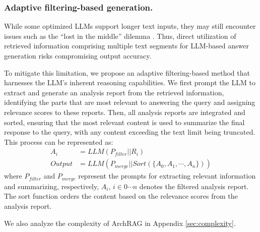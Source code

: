 % 



\subsubsection{Adaptive filtering-based generation. }
While some optimized LLMs support longer text inputs, they may still encounter issues such as the ``lost in the middle'' dilemma \cite{liu2024lost}. 
% 
Thus, direct utilization of retrieved information comprising multiple text segments for LLM-based answer generation risks compromising output accuracy.

To mitigate this limitation, we propose an adaptive filtering-based method that harnesses the LLM’s inherent reasoning capabilities.
% 
We first prompt the LLM to extract and generate an analysis report from the retrieved information, identifying the parts that are most relevant to answering the query and assigning relevance scores to these reports.
% 
Then, all analysis reports are integrated and sorted, ensuring that the most relevant content is used to summarize the final response to the query, with any content exceeding the text limit being truncated.
% 
This process can be represented as:
\begin{align}
A_i &= LLM(P_{filter}||R_i) \\
Output&=LLM(P_{merge}||Sort(\{A_0,A_1,\cdots,A_n\}))
\end{align}
where $P_{filter}$ and $P_{merge}$ represent the prompts for extracting relevant information and summarizing, respectively, 
$A_i$, $i \in 0 \cdots n$ denotes the filtered analysis report.
% 
The sort function orders the content based on the relevance scores from the analysis report. 

We also analyze the complexity of ArchRAG in Appendix \ref{sec:complexity}.


